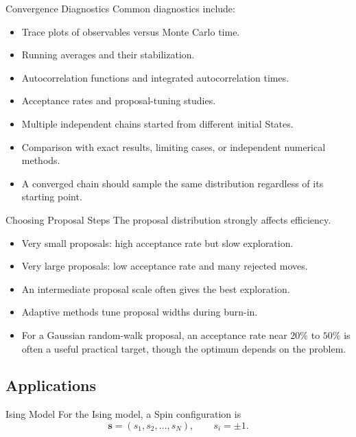 \documentclass[a4paper, 10pt, onepage]{elegantbook}
\begin{document}
{\begin{frame}{Convergence Diagnostics}
  Common diagnostics include:
  \begin{itemize}
    \item Trace plots of observables versus Monte Carlo time.
    \item Running averages and their stabilization.
    \item Autocorrelation functions and integrated autocorrelation times.
    \item Acceptance rates and proposal-tuning studies.
    \item Multiple independent chains started from different initial States.
    \item Comparison with exact results, limiting cases, or independent numerical methods.
  \end{itemize}

  \begin{itemize}
    \item A converged chain should sample the same distribution regardless of its starting point.
  \end{itemize}
\end{frame}

\begin{frame}{Choosing Proposal Steps}
  The proposal distribution strongly affects efficiency.

  \begin{itemize}
    \item Very small proposals: high acceptance rate but slow exploration.
    \item Very large proposals: low acceptance rate and many rejected moves.
    \item An intermediate proposal scale often gives the best exploration.
    \item Adaptive methods tune proposal widths during burn-in.
    \item For a Gaussian random-walk proposal, an acceptance rate near \(20\%\) to \(50\%\) is often a useful practical 
target, 
          though the optimum depends on the problem.
  \end{itemize}
\end{frame}

\subsection{Applications}

\begin{frame}{Ising Model}
  For the Ising model, a Spin configuration is
  \[
    \mathbf{s}=(s_1,s_2,\ldots,s_N),
    \qquad s_i=\pm1.
  \]


\end{frame}}
\end{document}
